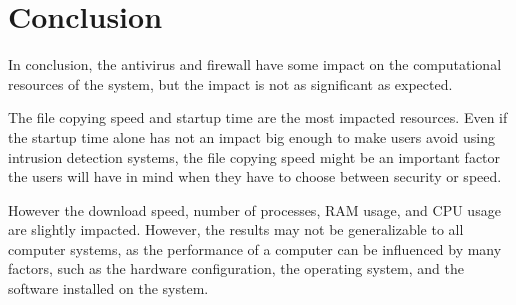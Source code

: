\documentclass[runningheads,a4paper,english]{llncs}[2022/01/12]
\begin{document}
\section{Conclusion}\label{sec:conclusion}

\par In conclusion, the antivirus and firewall have some impact on the
computational resources of the system, but the impact is not as significant as
expected.
\par The file copying speed and startup time are the most impacted
resources. Even if the startup time alone has not an impact big enough to make
users avoid using intrusion detection systems, the file copying speed might be
an important factor the users will have in mind when they have to choose
between security or speed.
\par However the download speed, number of processes, RAM usage, and CPU usage are
slightly impacted. However, the results may not be generalizable to all
computer systems, as the performance of a computer can be influenced by many
factors, such as the hardware configuration, the operating system, and the
software installed on the system.




\end{document}
